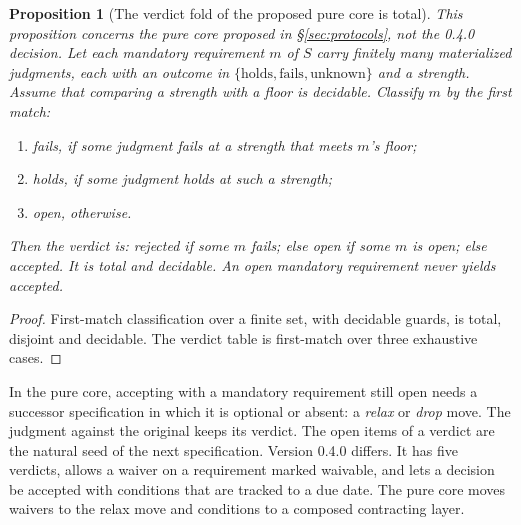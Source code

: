 \documentclass[11pt]{article}
\newtheorem{proposition}{Proposition}
\theoremstyle{definition}
\theoremstyle{remark}
\begin{document}
\begin{proposition}[The verdict fold of the proposed pure core is total]\label{prop:fold}
This proposition concerns the pure core proposed in §\ref{sec:protocols}, not the 0.4.0 decision.
Let each mandatory requirement $m$ of $S$ carry finitely many materialized judgments, each with an
outcome in $\{\text{holds},\text{fails},\text{unknown}\}$ and a strength. Assume that comparing a
strength with a floor is decidable. Classify $m$ by the first match:
\begin{enumerate}[itemsep=1pt]
\item \emph{fails}, if some judgment fails at a strength that meets $m$'s floor;
\item \emph{holds}, if some judgment holds at such a strength;
\item \emph{open}, otherwise.
\end{enumerate}
Then the verdict is: rejected if some $m$ fails; else open if some $m$ is open; else accepted. It is
total and decidable. An open mandatory requirement never yields \emph{accepted}.
\end{proposition}
\begin{proof}
First-match classification over a finite set, with decidable guards, is total, disjoint and
decidable. The verdict table is first-match over three exhaustive cases.
\end{proof}
\noindent In the pure core, accepting with a mandatory requirement still open needs a successor
specification in which it is optional or absent: a \emph{relax} or \emph{drop} move. The judgment
against the original keeps its verdict. The open items of a verdict are the natural seed of the
next specification. Version 0.4.0 differs. It has five verdicts, allows a waiver on a requirement
marked waivable, and lets a decision be accepted with conditions that are tracked to a due date.
The pure core moves waivers to the relax move and conditions to a composed contracting layer.
\end{document}
